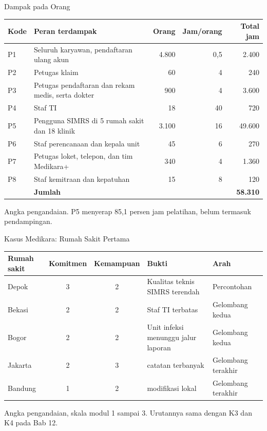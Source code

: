 \documentclass[aspectratio=169, table, 12pt]{beamer}
\begin{document}
\begin{frame}{{\Large Dampak pada Orang}}
  \scriptsize
  \begin{tabularx}{\textwidth}{l>{\raggedright\arraybackslash}Xrrr}
    \hline
    \textbf{Kode} & \textbf{Peran terdampak} & \textbf{Orang} & \textbf{Jam/orang} & \textbf{Total jam} \\ \hline
    P1 & Seluruh karyawan, pendaftaran ulang akun & 4.800 & 0,5 & 2.400 \\ \hline
    P2 & Petugas klaim & 60 & 4 & 240 \\ \hline
    P3 & Petugas pendaftaran dan rekam medis, serta dokter & 900 & 4 & 3.600 \\ \hline
    P4 & Staf TI & 18 & 40 & 720 \\ \hline
    P5 & Pengguna SIMRS di 5 rumah sakit dan 18 klinik & 3.100 & 16 & 49.600 \\ \hline
    P6 & Staf perencanaan dan kepala unit & 45 & 6 & 270 \\ \hline
    P7 & Petugas loket, telepon, dan tim Medikara+ & 340 & 4 & 1.360 \\ \hline
    P8 & Staf kemitraan dan kepatuhan & 15 & 8 & 120 \\ \hline
    & \textbf{Jumlah} & & & \textbf{58.310} \\ \hline
  \end{tabularx}

  \vspace{6pt}
  \small Angka pengandaian. P5 menyerap 85,1 persen jam pelatihan, belum termasuk pendampingan.
\end{frame}

\begin{frame}{{\Large Kasus Medikara: Rumah Sakit Pertama}}
  \footnotesize
  \begin{tabularx}{\textwidth}{lcc>{\raggedright\arraybackslash}X>{\raggedright\arraybackslash}p{3cm}}
    \hline
    \textbf{Rumah sakit} & \textbf{Komitmen} & \textbf{Kemampuan} & \textbf{Bukti} & \textbf{Arah} \\ \hline
    Depok & 3 & 2 & Kualitas teknis SIMRS terendah & Percontohan \\ \hline
    Bekasi & 2 & 2 & Staf TI terbatas & Gelombang kedua \\ \hline
    Bogor & 2 & 2 & Unit infeksi menunggu jalur laporan & Gelombang kedua \\ \hline
    Jakarta & 2 & 3 & 620.000 catatan terbanyak & Gelombang terakhir \\ \hline
    Bandung & 1 & 2 & 120 modifikasi lokal & Gelombang terakhir \\ \hline
  \end{tabularx}

  \vspace{8pt}
  \small Angka pengandaian, skala modul 1 sampai 3. Urutannya sama dengan K3 dan K4 pada Bab 12.
\end{frame}
\end{document}
